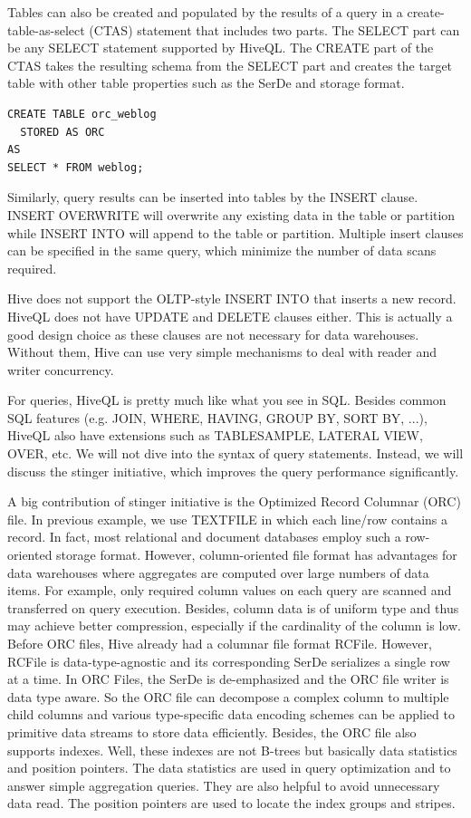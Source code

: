\documentclass[11pt]{book}
\begin{document}
Tables can also be created and populated by the results of a query in a create-table-as-select (CTAS) statement that includes two parts. The SELECT part can be any SELECT statement supported by HiveQL. The CREATE part of the CTAS takes the resulting schema from the SELECT part and creates the target table with other table properties such as the SerDe and storage format.

\begin{lstlisting}
CREATE TABLE orc_weblog
  STORED AS ORC
AS
SELECT * FROM weblog;
\end{lstlisting}
Similarly, query results can be inserted into tables by the INSERT clause. INSERT OVERWRITE will overwrite any existing data in the table or partition while INSERT INTO will append to the table or partition. Multiple insert clauses can be specified in the same query, which minimize the number of data scans required.

Hive does not support the OLTP-style INSERT INTO that inserts a new record. HiveQL does not have UPDATE and DELETE clauses either. This is actually a good design choice as these clauses are not necessary for data warehouses. Without them, Hive can use very simple mechanisms to deal with reader and writer concurrency.

For queries, HiveQL is pretty much like what you see in SQL. Besides common SQL features (e.g. JOIN, WHERE, HAVING, GROUP BY, SORT BY, ...), HiveQL also have extensions such as TABLESAMPLE, LATERAL VIEW, OVER, etc. We will not dive into the syntax of query statements. Instead, we will discuss the stinger initiative, which improves the query performance significantly.

A big contribution of stinger initiative is the Optimized Record Columnar (ORC) file. In previous example, we use TEXTFILE in which each line/row contains a record. In fact, most relational and document databases employ such a row-oriented storage format. However, column-oriented file format has advantages for data warehouses where aggregates are computed over large numbers of data items. For example, only required column values on each query are scanned and transferred on query execution. Besides, column data is of uniform type and thus may achieve better compression, especially if the cardinality of the column is low. Before ORC files, Hive already had a columnar file format RCFile. However, RCFile is data-type-agnostic and its corresponding SerDe serializes a single row at a time. In ORC Files, the SerDe is de-emphasized and the ORC file writer is data type aware. So the ORC file can decompose a complex column to multiple child columns and various type-specific data encoding schemes can be applied to primitive data streams to store data efficiently. Besides, the ORC file also supports indexes. Well, these indexes are not B-trees but basically data statistics and position pointers. The data statistics are used in query optimization and to answer simple aggregation queries. They are also helpful to avoid unnecessary data read. The position pointers are used to locate the index groups and stripes.
\end{document}
